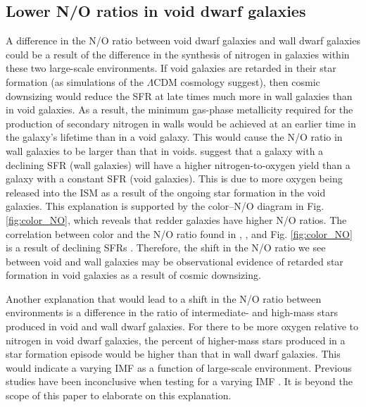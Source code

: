 \subsection{Lower N/O ratios in void dwarf galaxies}

A difference in the N/O ratio between void dwarf galaxies and wall dwarf 
galaxies could be a result of the difference in the synthesis of nitrogen in 
galaxies within these two large-scale environments.  If void galaxies are 
retarded in their star formation (as simulations of the $\Lambda$CDM cosmology 
suggest), then cosmic downsizing would reduce the SFR at late times much more in 
wall galaxies than in void galaxies.  As a result, the minimum gas-phase 
metallicity required for the production of secondary nitrogen in walls would be 
achieved at an earlier time in the galaxy's lifetime than in a void galaxy.  
This would cause the N/O ratio in wall galaxies to be larger than that in voids.  
\cite{vanZee06a} suggest that a galaxy with a declining SFR (wall galaxies) will 
have a higher nitrogen-to-oxygen yield than a galaxy with a constant SFR (void 
galaxies).  This is due to more oxygen being released into the ISM as a result 
of the ongoing star formation in the void galaxies.  This explanation is 
supported by the color--N/O diagram in Fig. \ref{fig:color_NO}, which reveals 
that redder galaxies have higher N/O ratios.  The correlation between color and 
the N/O ratio found in \cite{vanZee06a}, \cite{Berg12}, and Fig. 
\ref{fig:color_NO} is a result of declining SFRs \citep{vanZee06a}.  Therefore, 
the shift in the N/O ratio we see between void and wall galaxies may be 
observational evidence of retarded star formation in void galaxies as a result 
of cosmic downsizing.

Another explanation that would lead to a shift in the N/O ratio between 
environments is a difference in the ratio of intermediate- and high-mass stars 
produced in void and wall dwarf galaxies.  For there to be more oxygen relative 
to nitrogen in void dwarf galaxies, the percent of higher-mass stars produced in 
a star formation episode would be higher than that in wall dwarf galaxies.  This 
would indicate a varying IMF as a function of large-scale environment.  Previous 
studies have been inconclusive when testing for a varying IMF \citep[see][for 
example]{Kroupa01, Kroupa02, Hoversten08, Meurer09}.  It is beyond the scope of 
this paper to elaborate on this explanation.


